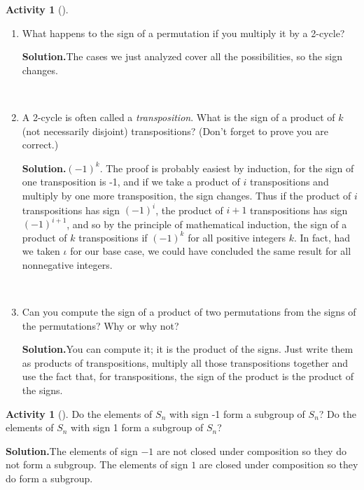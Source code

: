 \documentclass[10pt,]{book}
\theoremstyle{plain}
\theoremstyle{definition}
\newtheorem{activity}[project]{Activity}
\numberwithin{equation}{chapter}
\begin{document}
\begin{activity}[]
\begin{enumerate}[label=(\alph*)]
~\par
\item What happens to the sign of a permutation if you multiply it by a 2-cycle?%
\par\medskip\noindent%
\textbf{Solution.}\quad The cases we just analyzed cover all the possibilities, so the sign changes.%

~\par
\item A 2-cycle is often called a \emph{transposition}.  What is the sign of a product of \(k\) (not necessarily disjoint) transpositions? (Don't forget to prove you are correct.)%
\par\medskip\noindent%
\textbf{Solution.}\quad \((-1)^k\). The proof is probably easiest by induction, for the sign of one transposition is -1, and if we take a product of \(i\) transpositions and multiply by one more transposition, the sign changes. Thus if the product of \(i\) transpositions has sign \((-1)^i\), the product of \(i+1\) transpositions has sign \((-1)^{i+1}\), and so by the principle of mathematical induction, the sign of a product of \(k\) transpositions if \((-1)^k\) for all positive integers \(k\). In fact, had we taken \(\iota\) for our base case, we could have concluded the same result for all nonnegative integers.%

~\par
\item Can you compute the sign of a product of two permutations from the signs of the permutations?  Why or why not?%
\par\medskip\noindent%
\textbf{Solution.}\quad You can compute it; it is the product of the signs. Just write them as products of transpositions, multiply all those transpositions together and use the fact that, for transpositions, the sign of the product is the product of the signs.%

\end{enumerate}
\end{activity}
\begin{activity}[]\label{activity-261}
Do the elements of \(S_n\) with sign -1 form a subgroup of \(S_n\)? Do the elements of \(S_n\) with sign 1 form a subgroup of \(S_n\)?%
\par\medskip\noindent%
\textbf{Solution.}\quad The elements of sign \(-1\) are not closed under composition so they do not form a subgroup. The elements of sign \(1\) are closed under composition so they do form a subgroup.%
\end{activity}
\end{document}
